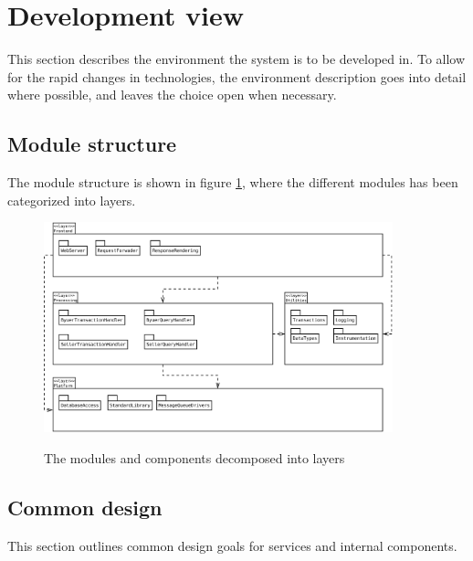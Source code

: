 \section{Development view}
\label{sec:development-view}
This section describes the environment the system is to be developed in. To
allow for the rapid changes in technologies, the environment description goes
into detail where possible, and leaves the choice open when necessary.

\subsection{Module structure}
\label{sec:module-structure}
The module structure is shown in figure \ref{fig:dev_module_structure}, where
the different modules has been categorized into layers.

\begin{figure}[ht]
    \centering
    \includegraphics[width=0.9\textwidth]{figures/dev_module_structure}
    \label{fig:dev_module_structure}
    \caption{The modules and components decomposed into layers}
\end{figure}

\subsection{Common design}
\label{sec:common-design}
This section outlines common design goals for services and internal components.

